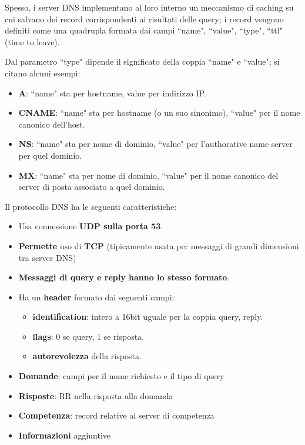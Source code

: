 \documentclass[11pt, italian, openany]{book}
\begin{document}
\begin{sloppypar}
\begin{itemize}[topsep=0pt]
	Spesso, i server DNS implementano al loro interno un meccanismo di caching su cui salvano dei record corrispondenti ai risultati delle query; i record vengono
	definiti come una quadrupla formata dai campi ``name", ``value", ``type", ``ttl" (time to leave).

	Dal parametro ``type" dipende il significato della coppia ``name" e ``value"; si citano alcuni esempi:
	\vspace{-3.5mm}
	\begin{itemize}
		\itemsep-0.3em
		\item \textbf{A}: ``name" sta per hostname, value per indirizzo IP.
		\item \textbf{CNAME}: ``name" sta per hostname (o un suo sinonimo), ``value" per il nome canonico dell'host.
		\item \textbf{NS}: ``name" sta per nome di dominio, ``value" per l'authorative name server per quel dominio.
		\item \textbf{MX}: ``name" sta per nome di dominio, ``value" per il nome canonico del server di posta associato a quel dominio.
	\end{itemize}

	Il protocollo DNS ha le seguenti caratteristiche:
	\vspace{-3.5mm}
	\begin{itemize}
		\itemsep-0.3em
		\item Usa connessione \textbf{UDP sulla porta 53}.
		\item \textbf{Permette} uso di \textbf{TCP} (tipicamente usata per messaggi di grandi dimensioni tra server DNS)
		\item \textbf{Messaggi di query e reply hanno lo stesso formato}.
		\item Ha un \textbf{header} formato dai seguenti campi:
		\begin{itemize}[topsep=0pt]
			\itemsep-0.3em
			\item \textbf{identification}: intero a 16bit uguale per la coppia query, reply.
			\item \textbf{flags}: 0 se query, 1 se risposta.
			\item \textbf{autorevolezza} della risposta.
		\end{itemize}
		\item \textbf{Domande}: campi per il nome richiesto e il tipo di query
		\item \textbf{Risposte}: RR nella risposta alla domanda
		\item \textbf{Competenza}: record relative ai server di competenza
		\item \textbf{Informazioni} aggiuntive
	\end{itemize}


\end{itemize}
\end{sloppypar}
\end{document}
